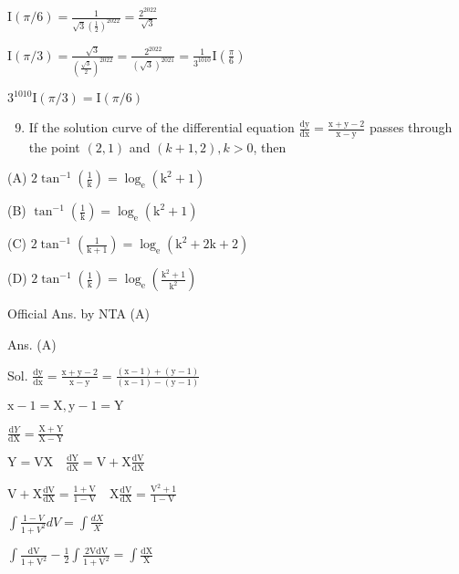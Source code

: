 \documentclass[10pt]{article}
\begin{document}
$\mathrm{I}(\pi / 6)=\frac{1}{\sqrt{3}\left(\frac{1}{2}\right)^{2022}}=\frac{2^{2022}}{\sqrt{3}}$

$\mathrm{I}(\pi / 3)=\frac{\sqrt{3}}{\left(\frac{\sqrt{3}}{2}\right)^{2022}}=\frac{2^{2022}}{(\sqrt{3})^{2021}}=\frac{1}{3^{1010}} \mathrm{I}\left(\frac{\pi}{6}\right)$

$3^{1010} \mathrm{I}(\pi / 3)=\mathrm{I}(\pi / 6)$

\begin{enumerate}
  \setcounter{enumi}{8}
  \item If the solution curve of the differential equation $\frac{\mathrm{dy}}{\mathrm{dx}}=\frac{\mathrm{x}+\mathrm{y}-2}{\mathrm{x}-\mathrm{y}}$ passes through the point $(2,1)$ and $(k+1,2), k>0$, then
\end{enumerate}

(A) $2 \tan ^{-1}\left(\frac{1}{\mathrm{k}}\right)=\log _{\mathrm{e}}\left(\mathrm{k}^{2}+1\right)$

(B) $\tan ^{-1}\left(\frac{1}{\mathrm{k}}\right)=\log _{\mathrm{e}}\left(\mathrm{k}^{2}+1\right)$

(C) $2 \tan ^{-1}\left(\frac{1}{\mathrm{k}+1}\right)=\log _{\mathrm{e}}\left(\mathrm{k}^{2}+2 \mathrm{k}+2\right)$

(D) $2 \tan ^{-1}\left(\frac{1}{\mathrm{k}}\right)=\log _{\mathrm{e}}\left(\frac{\mathrm{k}^{2}+1}{\mathrm{k}^{2}}\right)$

Official Ans. by NTA (A)

Ans. (A)

Sol. $\frac{\mathrm{dy}}{\mathrm{dx}}=\frac{\mathrm{x}+\mathrm{y}-2}{\mathrm{x}-\mathrm{y}}=\frac{(\mathrm{x}-1)+(\mathrm{y}-1)}{(\mathrm{x}-1)-(\mathrm{y}-1)}$

$\mathrm{x}-1=\mathrm{X}, \mathrm{y}-1=\mathrm{Y}$

$\frac{\mathrm{d} Y}{\mathrm{dX}}=\frac{\mathrm{X}+\mathrm{Y}}{\mathrm{X}-\mathrm{Y}}$

$\mathrm{Y}=\mathrm{VX} \quad \frac{\mathrm{dY}}{\mathrm{dX}}=\mathrm{V}+\mathrm{X} \frac{\mathrm{dV}}{\mathrm{dX}}$

$\mathrm{V}+\mathrm{X} \frac{\mathrm{dV}}{\mathrm{dX}}=\frac{1+\mathrm{V}}{1-\mathrm{V}} \quad \mathrm{X} \frac{\mathrm{dV}}{\mathrm{dX}}=\frac{\mathrm{V}^{2}+1}{1-\mathrm{V}}$

$\int \frac{1-V}{1+V^{2}} d V=\int \frac{d X}{X}$

$\int \frac{\mathrm{dV}}{1+\mathrm{V}^{2}}-\frac{1}{2} \int \frac{2 \mathrm{VdV}}{1+\mathrm{V}^{2}}=\int \frac{\mathrm{dX}}{\mathrm{X}}$
\end{document}
